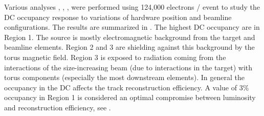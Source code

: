 Various analyses \cite{targetStudy}, \cite{clas12Beamline}, \cite{clas12Background}, were performed using 124,000 electrons / event
to study the DC occupancy response to variations of hardware position and beamline configurations.
The results are summarized in . The highest DC occupancy are in Region 1. The source is mostly electromagnetic background from the target
and beamline elements. Region 2 and 3 are shielding against this background by the torus magnetic field. Region 3 is exposed to radiation coming from
the interactions of the size-increasing beam (due to interactions in the target) with torus components (especially the most downstream elements).
In general the occupancy in the DC affects the track reconstruction efficiency. A value of 3$\%$ occupancy in Region 1
is considered an optimal compromise between luminosity and reconstruction efficiency, see \cite{recon-nim}.

